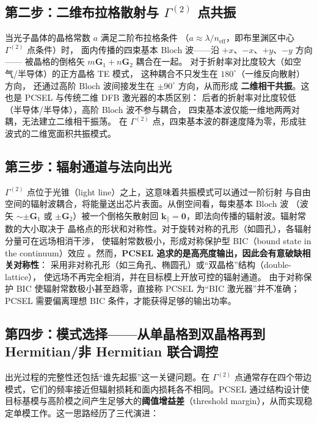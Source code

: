 \subsection{第二步：二维布拉格散射与 \texorpdfstring{$\Gamma^{(2)}$}{Gamma(2)} 点共振}
当光子晶体的晶格常数 $a$ 满足二阶布拉格条件
（$a\approx\lambda/n_{\mathrm{eff}}$，即布里渊区中心 $\Gamma^{(2)}$ 点条件）时，
面内传播的四束基本 Bloch 波——沿 $+x$、$-x$、$+y$、$-y$ 方向——
被晶格的倒格矢 $m\mathbf{G}_1+n\mathbf{G}_2$ 耦合在一起。
对于折射率对比度较大（如空气/半导体）的正方晶格 TE 模式，
这种耦合不只发生在 $180^\circ$（一维反向散射）方向，
还通过高阶 Bloch 波间接发生在 $\pm90^\circ$ 方向，从而形成
\textbf{二维相干共振}\cite{noda2023tutorial}。这也是 PCSEL 与传统二维 DFB 激光器的本质区别：
后者的折射率对比度较低（半导体/半导体），高阶 Bloch 波不参与耦合，
四束基本波仅能一维地两两对耦，无法建立二维相干振荡。
在 $\Gamma^{(2)}$ 点，四束基本波的群速度降为零，形成驻波式的二维宽面积共振模式。

\subsection{第三步：辐射通道与法向出光}
$\Gamma^{(2)}$ 点位于光锥（light line）之上，这意味着共振模式可以通过一阶衍射
与自由空间的辐射波耦合，将能量送出芯片表面。从倒空间看，每束基本 Bloch 波
（波矢 $\sim\pm\mathbf{G}_1$ 或 $\pm\mathbf{G}_2$）被一个倒格矢散射回
$\mathbf{k}_\parallel=\mathbf{0}$，即法向传播的辐射波。辐射常数的大小取决于
晶格点的形状和对称性。对于旋转对称的孔形（如圆孔），各辐射分量可在远场相消干涉，
使辐射常数极小，形成对称保护型 BIC（bound state in the continuum）效应
\cite{noda2023tutorial}。然而，\textbf{PCSEL 追求的是高亮度输出，因此会有意破缺相关对称性}：
采用非对称孔形（如三角孔、椭圆孔）或“双晶格”结构（double-lattice），
使远场不再完全相消，并在目标模上开放可控的辐射通道。
由于对称保护 BIC 使辐射常数极小甚至趋零，直接称 PCSEL 为“BIC 激光器”并不准确；
PCSEL 需要偏离理想 BIC 条件，才能获得足够的输出功率\cite{noda2023tutorial}。

\subsection{第四步：模式选择——从单晶格到双晶格再到 Hermitian/非 Hermitian 联合调控}
出光过程的完整性还包括“谁先起振”这一关键问题。在 $\Gamma^{(2)}$ 点通常存在四个带边模式，它们的频率接近但辐射损耗和面内损耗各不相同。PCSEL 通过结构设计使目标基模与高阶模之间产生足够大的\textbf{阈值增益差}（threshold margin），从而实现稳定单模工作。这一思路经历了三代演进\cite{noda2023tutorial}：

